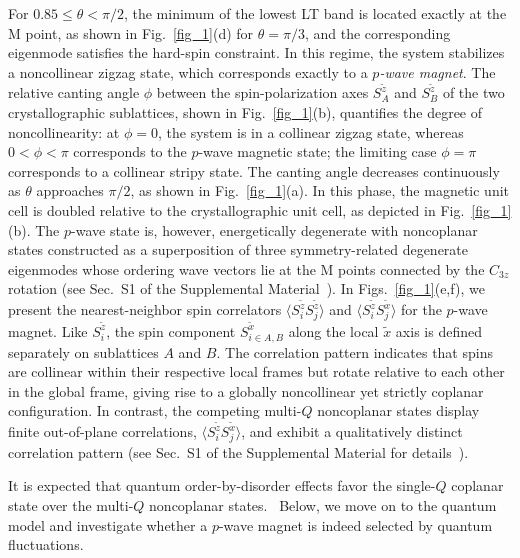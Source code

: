 \documentclass[aps,prl,twocolumn,showpacs,superscriptaddress]{revtex4-2}
\begin{document}
For $0.85 \le \theta < \pi/2$, the minimum of the lowest LT band is located exactly at the M point, as shown in Fig.~\ref{fig_1}(d) for $\theta = \pi/3$, and the corresponding eigenmode satisfies the hard-spin constraint. In this regime, the system stabilizes a noncollinear zigzag state, which corresponds exactly to a \textit{$p$-wave magnet}. The relative canting angle $\phi$ between the spin-polarization axes $S^{\tilde z}_A$ and $S^{\tilde z}_B$ of the two crystallographic sublattices, shown in Fig.~\ref{fig_1}(b), quantifies the degree of noncollinearity: at $\phi = 0$, the system is in a collinear zigzag state, whereas $0 < \phi < \pi$ corresponds to the $p$-wave magnetic state; the limiting case $\phi = \pi$ corresponds to a collinear stripy state. The canting angle decreases continuously as $\theta$ approaches $\pi/2$, as shown in Fig.~\ref{fig_1}(a). In this phase, the magnetic unit cell is doubled relative to the crystallographic unit cell, as depicted in Fig.~\ref{fig_1}(b). The $p$-wave state is, however, energetically degenerate with noncoplanar states constructed as a superposition of three symmetry-related degenerate eigenmodes whose ordering wave vectors lie at the M points connected by the $C_{3z}$ rotation (see Sec.~S1 of the Supplemental Material~\cite{supplemental}). In Figs.~\ref{fig_1}(e,f), we present the nearest-neighbor spin correlators $\langle S^{\tilde z}_{i} S^{\tilde z}_{j} \rangle$ and $\langle S^{\tilde z}_{i} S^{\tilde x}_{j} \rangle$ for the $p$-wave magnet. Like $S^{\tilde z}_i$, the spin component $S^{\tilde x}_{i\in A,B}$ along the local $\tilde{x}$ axis is defined separately on sublattices $A$ and $B$. The correlation pattern indicates that spins are collinear within their respective local frames but rotate relative to each other in the global frame, giving rise to a globally noncollinear yet strictly coplanar configuration. In contrast, the competing multi-$Q$ noncoplanar states display finite out-of-plane correlations, $\langle S^{\tilde z}_{i} S^{\tilde x}_{j} \rangle$, and exhibit a qualitatively distinct correlation pattern (see Sec.~S1 of the Supplemental Material for details~\cite{supplemental}).

It is expected that quantum order-by-disorder effects favor the single-$Q$ coplanar state over the multi-$Q$ noncoplanar states.~\cite{henley1989ordering,PhysRevB.46.11137} Below, we move on to the quantum model and investigate whether a $p$-wave magnet is indeed selected by quantum fluctuations.
\end{document}
